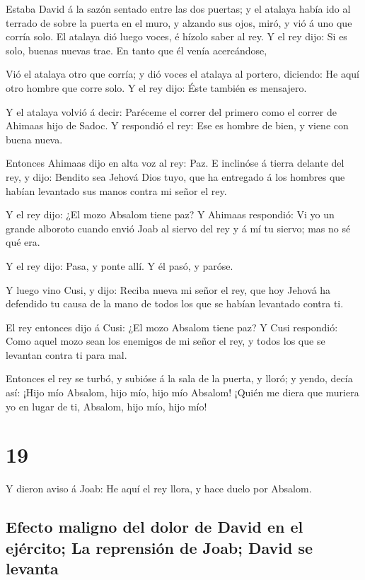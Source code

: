  Estaba David á la sazón sentado entre las dos puertas; y
el atalaya había ido al terrado de sobre la puerta en el muro, y alzando
sus ojos, miró, y vió á uno que corría solo.  El atalaya
dió luego voces, é hízolo saber al rey. Y el rey dijo: Si es solo,
buenas nuevas trae. En tanto que él venía acercándose,

 Vió el atalaya otro que corría; y dió voces el atalaya al
portero, diciendo: He aquí otro hombre que corre solo. Y el rey dijo:
Éste también es mensajero.

 Y el atalaya volvió á decir: Paréceme el correr del
primero como el correr de Ahimaas hijo de Sadoc. Y respondió el rey: Ese
es hombre de bien, y viene con buena nueva.

 Entonces Ahimaas dijo en alta voz al rey: Paz. E inclinóse
á tierra delante del rey, y dijo: Bendito sea Jehová Dios tuyo, que ha
entregado á los hombres que habían levantado sus manos contra mi señor
el rey.

 Y el rey dijo: ¿El mozo Absalom tiene paz? Y Ahimaas
respondió: Vi yo un grande alboroto cuando envió Joab al siervo del rey
y á mí tu siervo; mas no sé qué era.

 Y el rey dijo: Pasa, y ponte allí. Y él pasó, y paróse.

 Y luego vino Cusi, y dijo: Reciba nueva mi señor el rey,
que hoy Jehová ha defendido tu causa de la mano de todos los que se
habían levantado contra ti.

 El rey entonces dijo á Cusi: ¿El mozo Absalom tiene paz? Y
Cusi respondió: Como aquel mozo sean los enemigos de mi señor el rey, y
todos los que se levantan contra ti para mal.

 Entonces el rey se turbó, y subióse á la sala de la
puerta, y lloró; y yendo, decía así: ¡Hijo mío Absalom, hijo mío, hijo
mío Absalom! ¡Quién me diera que muriera yo en lugar de ti, Absalom,
hijo mío, hijo mío!

\hypertarget{section-18}{%
\section{19}\label{section-18}}

 Y dieron aviso á Joab: He aquí el rey llora, y hace duelo
por Absalom.

\hypertarget{efecto-maligno-del-dolor-de-david-en-el-ejuxe9rcito-la-reprensiuxf3n-de-joab-david-se-levanta}{%
\subsection{Efecto maligno del dolor de David en el ejército; La
reprensión de Joab; David se
levanta}\label{efecto-maligno-del-dolor-de-david-en-el-ejuxe9rcito-la-reprensiuxf3n-de-joab-david-se-levanta}}

